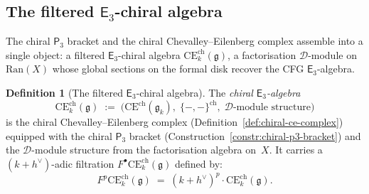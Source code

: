 \documentclass[11pt,reqno]{amsart}
\theoremstyle{definition}
\newtheorem{definition}[theorem]{Definition}
\theoremstyle{remark}
\newcommand{\cD}{\mathcal{D}}
\newcommand{\Ran}{\mathrm{Ran}}
\newcommand{\CE}{\mathrm{CE}}
\newcommand{\Ethree}{\mathsf{E}_{3}}
\newcommand{\Pthree}{\mathsf{P}_{3}}
\newcommand{\fg}{\mathfrak{g}}
\numberwithin{equation}{section}
\begin{document}
\subsection{The filtered $\Ethree$-chiral algebra}
\label{subsec:filtered-e3-chiral}

The chiral $\Pthree$ bracket and the chiral
Chevalley--Eilenberg complex assemble into a single object:
a filtered $\Ethree$-chiral algebra
$\CE^{\mathrm{ch}}_k(\fg)$, a factorisation $\cD$-module
on $\Ran(X)$ whose global sections on the formal disk
recover the CFG $\Ethree$-algebra.

\begin{definition}[The filtered $\Ethree$-chiral algebra]
\label{def:filtered-e3-chiral}
The \emph{chiral $\Ethree$-algebra}
\begin{equation}\label{eq:chiral-e3-algebra}
  \CE^{\mathrm{ch}}_k(\fg)
  \;:=\;
  \bigl(\CE^{\mathrm{ch}}(\fg_k),\;
  \{-,-\}^{\mathrm{ch}},\;
  \cD\textrm{-module structure}\bigr)
\end{equation}
is the chiral Chevalley--Eilenberg complex
(Definition~\ref{def:chiral-ce-complex}) equipped with
the chiral $\Pthree$ bracket
(Construction~\ref{constr:chiral-p3-bracket}) and the
$\cD$-module structure from the factorisation algebra
on~$X$. It carries a $(k+h^\vee)$-adic filtration
$F^\bullet \CE^{\mathrm{ch}}_k(\fg)$ defined by:
\begin{equation}\label{eq:hbar-filtration}
  F^p \CE^{\mathrm{ch}}_k(\fg)
  \;=\;
  (k+h^\vee)^p \cdot \CE^{\mathrm{ch}}_k(\fg).
\end{equation}
\end{definition}
\end{document}
